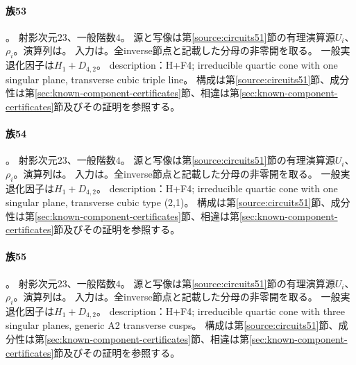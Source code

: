\paragraph{族53}\label{catalogue:R4_MINIMAL_M}
。
射影次元$23$、一般階数$4$。
源と写像は第\ref{source:circuits51}節の有理演算源$U_i$、$\rho_i$。演算列は。
入力は。全inverse節点と記載した分母の非零開を取る。
一般実退化因子は$H_{1}+D_{4,2}$。
description：H+F4; irreducible quartic cone with one singular plane, transverse cubic triple line。
構成は第\ref{source:circuits51}節、成分性は第\ref{sec:known-component-certificates}節、相違は第\ref{sec:known-component-certificates}節及びその証明を参照する。

\paragraph{族54}\label{catalogue:R4_A0}
。
射影次元$23$、一般階数$4$。
源と写像は第\ref{source:circuits51}節の有理演算源$U_i$、$\rho_i$。演算列は。
入力は。全inverse節点と記載した分母の非零開を取る。
一般実退化因子は$H_{1}+D_{4,2}$。
description：H+F4; irreducible quartic cone with one singular plane, transverse cubic type (2,1)。
構成は第\ref{source:circuits51}節、成分性は第\ref{sec:known-component-certificates}節、相違は第\ref{sec:known-component-certificates}節及びその証明を参照する。

\paragraph{族55}\label{catalogue:R4_DPM}
。
射影次元$23$、一般階数$4$。
源と写像は第\ref{source:circuits51}節の有理演算源$U_i$、$\rho_i$。演算列は。
入力は。全inverse節点と記載した分母の非零開を取る。
一般実退化因子は$H_{1}+D_{4,2}$。
description：H+F4; irreducible quartic cone with three singular planes, generic A2 transverse cusps。
構成は第\ref{source:circuits51}節、成分性は第\ref{sec:known-component-certificates}節、相違は第\ref{sec:known-component-certificates}節及びその証明を参照する。

